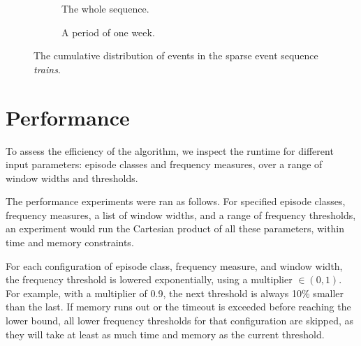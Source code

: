 \begin{figure}
\begin{subfigure}{0.5\textwidth}
\centering
{}
\caption{The whole sequence.}
\end{subfigure}%
\begin{subfigure}{.5\textwidth}
\caption{A period of one week.}
\label{fig:trains-cumulative-part}
\end{subfigure}
\caption{The cumulative distribution of events in the sparse event sequence \emph{trains}.}
\label{fig:trains-cumulative}
\end{figure}


\section{Performance}
\label{sec:performance}

To assess the efficiency of the algorithm, we inspect the runtime for different input parameters: episode classes and frequency measures, over a range of window widths and thresholds.

The performance experiments were ran as follows. For specified episode classes, frequency measures, a list of window widths, and a range of frequency thresholds, an experiment would run the Cartesian product of all these parameters, within time and memory constraints.

For each configuration of episode class, frequency measure, and window width, the frequency threshold is lowered exponentially, using a multiplier $ \in (0, 1) $. For example, with a multiplier of 0.9, the next threshold is always 10\% smaller than the last. If memory runs out or the timeout is exceeded before reaching the lower bound, all lower frequency thresholds for that configuration are skipped, as they will take at least as much time and memory as the current threshold.

